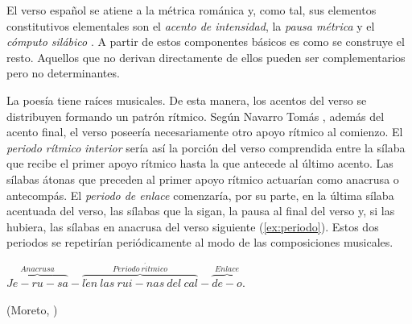 El verso español se atiene a la métrica románica y, como tal, sus elementos constitutivos elementales son el \textit{acento de intensidad}, la \textit{pausa métrica} y el \textit{cómputo silábico} \parencite[22]{baehr1997}. A partir de estos componentes básicos es como se construye el resto. Aquellos que no derivan directamente de ellos pueden ser complementarios pero no determinantes.

La poesía tiene raíces musicales. De esta manera, los acentos del verso se distribuyen formando un patrón rítmico. Según Navarro Tomás \parencite*[35-36]{navarrotomas1991}, además del acento final, el verso poseería necesariamente otro apoyo rítmico al comienzo. El \textit{periodo rítmico} \textit{interior} sería así la porción del verso comprendida entre la sílaba que recibe el primer apoyo rítmico  hasta la que antecede al último acento. Las sílabas átonas que preceden al primer apoyo rítmico actuarían como anacrusa o antecompás. El \textit{periodo de enlace} comenzaría, por su parte, en la última sílaba acentuada del verso, las sílabas que la sigan, la pausa al final del verso y, si las hubiera, las sílabas en anacrusa del verso siguiente (\ref{ex:periodo}). Estos dos periodos se repetirían periódicamente al modo de las composiciones musicales.

\begin{exe}
	\ex\label{ex:periodo}$\overbrace{Je-ru-sa}^{Anacrusa}-\overbrace{l\acute{e}n\ las\ rui-nas\ del\ cal}^{Periodo\ r\acute{i}tmico}-\overbrace{de-o}^{Enlace}.$\\
	\strut\hfill(Moreto, )
\end{exe}

